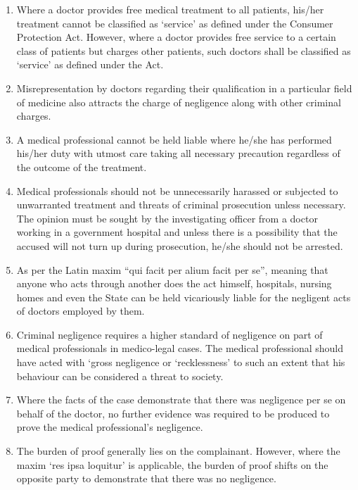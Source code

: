 \begin{multicols}{2}
\begin{enumerate}
\item Where a doctor provides free medical treatment to all patients, his/her treatment cannot be
classified as ‘service’ as defined under the Consumer Protection Act. However, where a doctor
provides free service to a certain class of patients but charges other patients, such doctors shall be
classified as ‘service’ as defined under the Act.

\item Misrepresentation by doctors regarding their qualification in a particular field of medicine also
attracts the charge of negligence along with other criminal charges.

\item A medical professional cannot be held liable where he/she has performed his/her duty with
utmost care taking all necessary precaution regardless of the outcome of the treatment.

\item Medical professionals should not be unnecessarily harassed or subjected to unwarranted
treatment and threats of criminal prosecution unless necessary. The opinion must be sought by
the investigating officer from a doctor working in a government hospital and unless there is a
possibility that the accused will not turn up during prosecution, he/she should not be arrested.

\item As per the Latin maxim “qui facit per alium facit per se”, meaning that anyone who acts through
another does the act himself, hospitals, nursing homes and even the State can be held vicariously
liable for the negligent acts of doctors employed by them.

\item Criminal negligence requires a higher standard of negligence on part of medical professionals
in medico-legal cases. The medical professional should have acted with ‘gross negligence or
‘recklessness’ to such an extent that his behaviour can be considered a threat to society.

\item Where the facts of the case demonstrate that there was negligence per se on behalf of the
doctor, no further evidence was required to be produced to prove the medical professional’s
negligence.

\item The burden of proof generally lies on the complainant. However, where the maxim ‘res ipsa
loquitur’ is applicable, the burden of proof shifts on the opposite party to demonstrate that there
was no negligence.


\end{enumerate}
\end{multicols}
